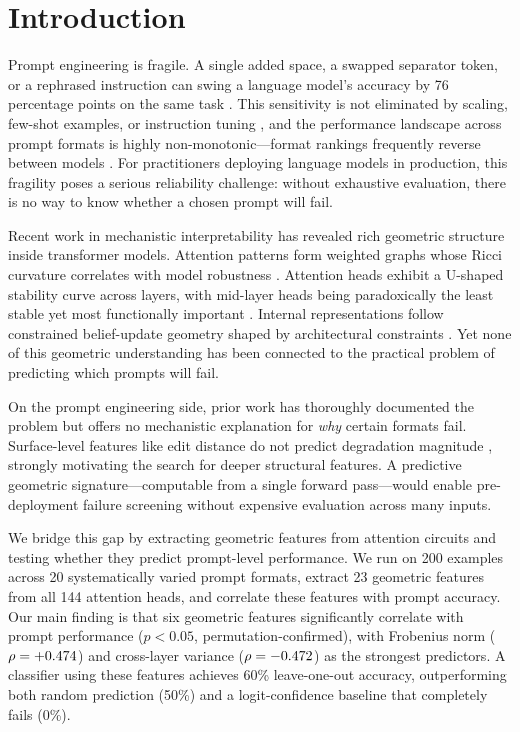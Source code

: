 \section{Introduction}
\label{sec:intro}

Prompt engineering is fragile.
A single added space, a swapped separator token, or a rephrased instruction can swing a language model's accuracy by 76 percentage points on the same task \citep{sclar2023quantifying}.
This sensitivity is not eliminated by scaling, few-shot examples, or instruction tuning \citep{mizrahi2024state}, and the performance landscape across prompt formats is highly non-monotonic---format rankings frequently reverse between models \citep{sclar2023quantifying}.
For practitioners deploying language models in production, this fragility poses a serious reliability challenge: without exhaustive evaluation, there is no way to know whether a chosen prompt will fail.

Recent work in mechanistic interpretability has revealed rich geometric structure inside transformer models.
Attention patterns form weighted graphs whose Ricci curvature correlates with model robustness \citep{park2024geometry}.
Attention heads exhibit a U-shaped stability curve across layers, with mid-layer heads being paradoxically the least stable yet most functionally important \citep{bali2026quantifying}.
Internal representations follow constrained belief-update geometry shaped by architectural constraints \citep{piotrowski2025constrained}.
Yet none of this geometric understanding has been connected to the practical problem of predicting which prompts will fail.

On the prompt engineering side, prior work has thoroughly documented the problem \citep{sclar2023quantifying, mizrahi2024state, zhu2023promptbench} but offers no mechanistic explanation for \emph{why} certain formats fail.
Surface-level features like edit distance do not predict degradation magnitude \citep{mizrahi2024state}, strongly motivating the search for deeper structural features.
A predictive geometric signature---computable from a single forward pass---would enable pre-deployment failure screening without expensive evaluation across many inputs.

We bridge this gap by extracting geometric features from attention circuits and testing whether they predict prompt-level performance.
We run \gptsmall on 200 \ssttwo examples across 20 systematically varied prompt formats, extract 23 geometric features from all 144 attention heads, and correlate these features with prompt accuracy.
Our main finding is that six geometric features significantly correlate with prompt performance ($p < 0.05$, permutation-confirmed), with Frobenius norm ($\rho = +0.474$) and cross-layer variance ($\rho = -0.472$) as the strongest predictors.
A classifier using these features achieves 60\% leave-one-out accuracy, outperforming both random prediction (50\%) and a logit-confidence baseline that completely fails (0\%).

